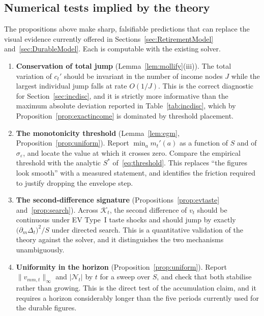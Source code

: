 \subsection{Numerical tests implied by the theory}
\label{subsec:smooth_tests}

The propositions above make sharp, falsifiable predictions that can replace the visual
evidence currently offered in Sections~\ref{sec:RetirementModel}
and~\ref{sec:DurableModel}. Each is computable with the existing solver.

\begin{enumerate}
    \item \textbf{Conservation of total jump} (Lemma~\ref{lem:mollify}(iii)). The total
    variation of $c_t'$ should be invariant in the number of income nodes $J$ while the
    largest individual jump falls at rate $O(1/J)$. This is the correct diagnostic for
    Section~\ref{sec:incdisc}, and it is strictly more informative than the maximum
    absolute deviation reported in Table~\ref{tab:incdisc}, which by
    Proposition~\ref{prop:exactincome} is dominated by threshold placement.

    \item \textbf{The monotonicity threshold} (Lemma~\ref{lem:egm},
    Proposition~\ref{prop:uniform}). Report $\min_a m_t'(a)$ as a function of $S$ and of
    $\sigma_\varepsilon$, and locate the value at which it crosses zero. Compare the
    empirical threshold with the analytic $S^{\ast}$ of~\eqref{eq:threshold}. This
    replaces ``the figures look smooth'' with a measured statement, and identifies the
    friction required to justify dropping the envelope step.

    \item \textbf{The second-difference signature} (Propositions~\ref{prop:evtaste}
    and~\ref{prop:search}). Across $\mathcal{K}_t$, the second difference of $v_t$
    should be continuous under EV Type~I taste shocks and should jump by exactly
    $\big(\partial_m\Delta_t\big)^{2}/S$ under directed search. This is a quantitative
    validation of the theory against the solver, and it distinguishes the two
    mechanisms unambiguously.

    \item \textbf{Uniformity in the horizon} (Proposition~\ref{prop:uniform}). Report
    $\|v_{mm,t}\|_{\infty}$ and $|\mathcal{N}_t|$ by $t$ for a sweep over $S$, and check
    that both stabilise rather than growing. This is the direct test of the accumulation
    claim, and it requires a horizon considerably longer than the five periods currently
    used for the durable figures.


\end{enumerate}
